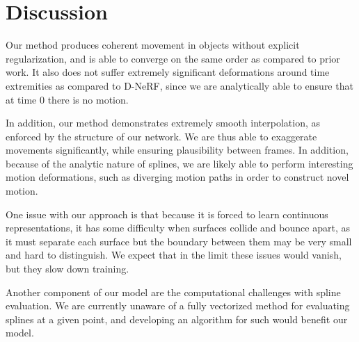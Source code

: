 \section*{Discussion}

Our method produces coherent movement in objects without explicit regularization, and is able to
converge on the same order as compared to prior work. It also does not suffer extremely significant deformations around time extremities as compared to D-NeRF, since we are analytically able to ensure that at time 0 there is no motion.

In addition, our method demonstrates extremely smooth interpolation, as enforced by the structure of our network.
We are thus able to exaggerate movements significantly, while ensuring plausibility between frames. In addition, because of the analytic nature
of splines, we are likely able to perform interesting motion deformations, such as diverging motion paths in order to construct novel motion.

One issue with our approach is that because it is forced to learn continuous representations, it has some difficulty when surfaces collide and bounce apart, as it must separate each surface but the boundary between them may be very small and hard to distinguish. We expect that in the limit these issues would vanish, but they slow down training.

Another component of our model are the computational challenges with spline evaluation. We are currently unaware of a fully vectorized method for evaluating splines at a given point, and developing an algorithm for such would benefit our model.